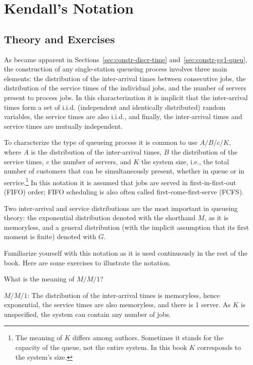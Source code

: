 \section{Kendall's Notation}
\label{sec:kendalls-notation}




\subsection*{Theory and Exercises}

As became apparent in Sections~\ref{sec:constr-discr-time}
and~\ref{sec:constr-gg1-queu}, the construction of any single-station queueing
process involves three main elements: 
the distribution of the
inter-arrival times between consecutive jobs, the distribution of the
service times of the individual jobs, and the number of servers
present to process jobs. In this characterization it is implicit that
the inter-arrival times form a set of i.i.d. (independent and
identically distributed) random variables, the service times are also
i.i.d., and finally, the inter-arrival times and service times are
mutually independent.

To characterize the type of queueing process it is common to use 
 $A/B/c/K$, where $A$ is the distribution of the
inter-arrival times, $B$ the distribution of the service times, $c$ the
number of servers, and $K$ the system size, i.e., the total number of customers that can be simultaneously present, whether in queue or in service.\footnote{The meaning of $K$ differs among authors. Sometimes it stands for
  the capacity of the queue, not the entire system. In this book $K$ corresponds to the system's size.}
In this notation it is assumed that jobs are served in
first-in-first-out (FIFO) order; FIFO scheduling is also often called
first-come-first-serve (FCFS). 

Two inter-arrival and service
distributions  are the most important in queueing theory: the
exponential distribution denoted with the shorthand $M$, as it is
memoryless, and a general distribution (with the implicit assumption
that its first moment is finite) denoted with $G$.

Familiarize yourself with this notation as it is used continuously in the rest of the book. Here are some exercises to illustrate the notation.

\begin{exercise}[\faPhoto]
  What is the meaning of $M/M/1$?
  \begin{solution}
$M/M/1$: The distribution of the inter-arrival times is
  memoryless, hence exponential, the service times are also
  memoryless, and there is 1 server. As $K$ is unspecified, the system can contain any number of jobs.
  \end{solution}
\end{exercise}

